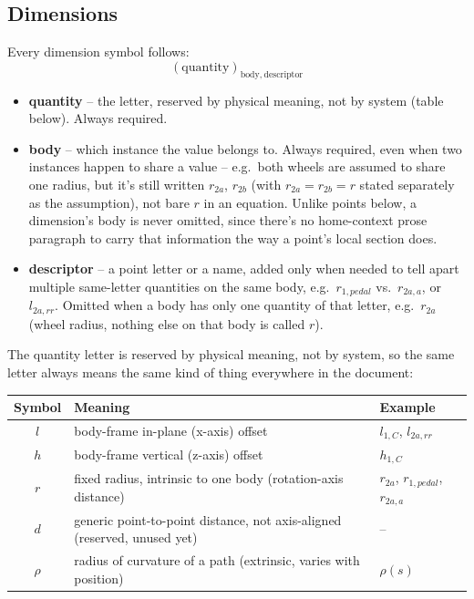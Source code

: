 \subsection{Dimensions}
Every dimension symbol follows:
\begin{equation}
    (\text{quantity})_{\text{body},\ \text{descriptor}}
\end{equation}
\begin{itemize}
    \item \textbf{quantity} -- the letter, reserved by physical meaning, not by system (table below). Always required.
    \item \textbf{body} -- which instance the value belongs to. Always required, even when two instances happen to share a value -- e.g.\ both wheels are assumed to share one radius, but it's still written $r_{2a}$, $r_{2b}$ (with $r_{2a}=r_{2b}=r$ stated separately as the assumption), not bare $r$ in an equation. Unlike points below, a dimension's body is never omitted, since there's no home-context prose paragraph to carry that information the way a point's local section does.
    \item \textbf{descriptor} -- a point letter or a name, added only when needed to tell apart multiple same-letter quantities on the same body, e.g.\ $r_{1,pedal}$ vs.\ $r_{2a,a}$, or $l_{2a,rr}$. Omitted when a body has only one quantity of that letter, e.g.\ $r_{2a}$ (wheel radius, nothing else on that body is called $r$).
\end{itemize}

The quantity letter is reserved by physical meaning, not by system, so the same letter always means the same kind of thing everywhere in the document:
\begin{center}
\begin{tabular}{c l l}
    Symbol & Meaning & Example \\
    \hline
    $l$ & body-frame in-plane (x-axis) offset & $l_{1,C}$, $l_{2a,rr}$ \\
    $h$ & body-frame vertical (z-axis) offset & $h_{1,C}$ \\
    $r$ & fixed radius, intrinsic to one body (rotation-axis distance) & $r_{2a}$, $r_{1,pedal}$, $r_{2a,a}$ \\
    $d$ & generic point-to-point distance, not axis-aligned (reserved, unused yet) & -- \\
    $\rho$ & radius of curvature of a path (extrinsic, varies with position) & $\rho(s)$
\end{tabular}
\end{center}

